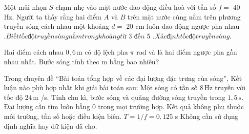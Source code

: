 \begin{ex}
Một mũi nhọn $S$ chạm nhẹ vào mặt nước dao động điều hoà với tần số $f =$ 40 $\mathrm{Hz}$. Người ta thấy rằng hai điểm $A$ và $B$ trên mặt nước cùng nằm trên phương truyền sóng cách nhau một khoảng $d =$ 20 $\mathrm{cm}$ luôn dao động ngược pha nhau $. Biết tốc độ truyền sóng nằm trong khoảng từ$ 3  $đến$ 5  $. Xác định tốc độ truyền sóng.$ 
\choiceTF

\end{ex}

\begin{ex}
Hai điểm cách nhau $0,6\,\text{m}$ có độ lệch pha $\pi$ rad và là hai điểm ngược pha gần nhau nhất. Bước sóng tính theo m bằng bao nhiêu?
\end{ex}

\begin{ex}
Trong chuyên đề “Bài toán tổng hợp về các đại lượng đặc trưng của sóng”, Kết luận nào phù hợp nhất khi giải bài toán sau: Một sóng có tần số $8\,\text{Hz}$ truyền với tốc độ $24\,\text{m}$ /s. Tính chu kì, bước sóng và quãng đường sóng truyền trong $1,5\,\text{s}$.
\choice
{Đại lượng cần tìm luôn bằng 0 trong mọi trường hợp.}
{Kết quả không phụ thuộc môi trường, tần số hoặc điều kiện biên.}
{\True $T=1/f=0,125$ s}
{Không cần sử dụng định nghĩa hay dữ kiện đã cho.}
\end{ex}

